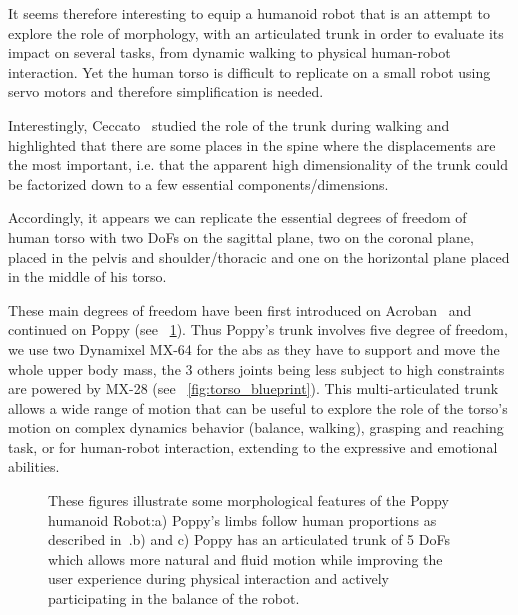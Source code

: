 It seems therefore interesting to equip a humanoid robot that is an attempt to explore the role of morphology, with an articulated trunk in order to evaluate its impact on several tasks, from dynamic walking to physical human-robot interaction. Yet the human torso is difficult to replicate on a small robot using servo motors and therefore simplification is needed.

Interestingly, Ceccato~\parencite{ceccatoPlos09} studied the role of the trunk during walking and highlighted that there are some places in the spine where the displacements are the most important, i.e. that the apparent high dimensionality of the trunk could be factorized down to a few essential components/dimensions.

Accordingly, it appears we can replicate the essential degrees of freedom of human torso with two DoFs on the sagittal plane, two on the coronal plane, placed in the pelvis and shoulder/thoracic and one on the horizontal plane placed in the middle of his torso.

These main degrees of freedom have been first introduced on Acroban~\parencite{ly2011bio} and continued on Poppy (see \figurename~\ref{fig:poppy_torso}).
Thus Poppy's trunk involves five degree of freedom, we use two Dynamixel MX-64 for the abs as they have to support and move the whole upper body mass, the 3 others joints being less subject to high constraints are powered by MX-28 (see \figurename~\ref{fig:torso_blueprint}). This multi-articulated trunk allows a wide range of motion that can be useful to explore the role of the torso’s motion on complex dynamics behavior (balance, walking), grasping and reaching task, or for human-robot interaction, extending to the expressive and emotional abilities.

\begin{figure}[p]
\centering


    \hfil
    \caption{These figures illustrate some morphological features of the Poppy humanoid Robot:\newline a) Poppy's limbs follow human proportions as described in~\parencite{dufour2005biomecanique}.\newline b) and c) Poppy has an articulated trunk of 5 DoFs which allows more natural and fluid motion while improving the user experience during physical interaction and actively participating in the balance of the robot.}
    \label{fig:poppy_torso}
\end{figure}



